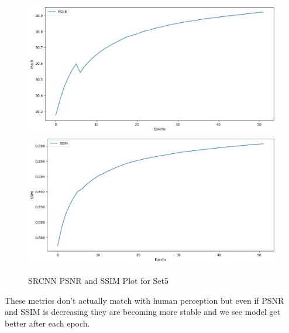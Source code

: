 \newpage 
\begin{figure}[ht]
    \centering
    \includegraphics[width=6in]{./figures/SRCNN_PSNR.png}
    \includegraphics[width=6in]{./figures/SRCNN_SSIM.png}
    \caption{SRCNN PSNR and SSIM Plot for Set5}
\end{figure} 
    These metrics don't actually match with human perception but even if PSNR and SSIM is decreasing they are becoming more stable and we see model get better after each epoch.
\newpage
